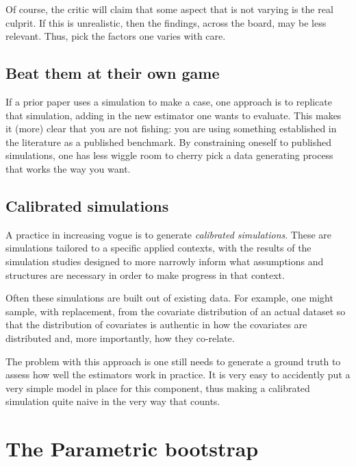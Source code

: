 \documentclass[
]{book}
\begin{document}
Of course, the critic will claim that some aspect that is not varying is the real culprit.
If this is unrealistic, then the findings, across the board, may be less relevant.
Thus, pick the factors one varies with care.

\hypertarget{beat-them-at-their-own-game}{%
\section{Beat them at their own game}\label{beat-them-at-their-own-game}}

If a prior paper uses a simulation to make a case, one approach is to replicate that simulation, adding in the new estimator one wants to evaluate.
This makes it (more) clear that you are not fishing: you are using something established in the literature as a published benchmark.
By constraining oneself to published simulations, one has less wiggle room to cherry pick a data generating process that works the way you want.

\hypertarget{calibrated-simulations}{%
\section{Calibrated simulations}\label{calibrated-simulations}}

A practice in increasing vogue is to generate \emph{calibrated simulations}.
These are simulations tailored to a specific applied contexts, with the results of the simulation studies designed to more narrowly inform what assumptions and structures are necessary in order to make progress in that context.

Often these simulations are built out of existing data.
For example, one might sample, with replacement, from the covariate distribution of an actual dataset so that the distribution of covariates is authentic in how the covariates are distributed and, more importantly, how they co-relate.

The problem with this approach is one still needs to generate a ground truth to assess how well the estimators work in practice.
It is very easy to accidently put a very simple model in place for this component, thus making a calibrated simulation quite naive in the very way that counts.

\hypertarget{the-parametric-bootstrap}{%
\chapter{The Parametric bootstrap}\label{the-parametric-bootstrap}}
\end{document}
